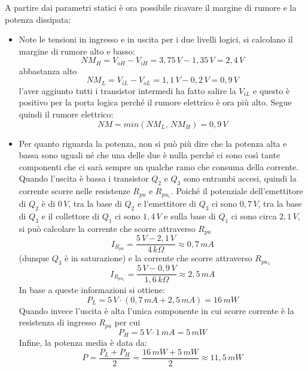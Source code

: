\documentclass[12pt, a4paper]{report}
\begin{document}
A partire dai parametri statici è ora possibile ricavare il margine di rumore e la potenza dissipata:
\begin{itemize}
    \item Note le tensioni in ingresso e in uscita per i due livelli logici, si calcolano il margine di rumore alto e basso:
    \begin{equation*}
        \textit{NM}_{H} = V_{oH} - V_{iH} = 3,75\,V - 1,35\,V = 2,4\,V
    \end{equation*}
    abbastanza alto
    \begin{equation*}
        \textit{NM}_{L} = V_{iL} - V_{oL} = 1,1\,V - 0,2\,V = 0,9\,V
    \end{equation*}
    l'aver aggiunto tutti i transistor intermedi ha fatto salire la $V_{iL}$ e questo è positivo per la porta logica perché il rumore elettrico è ora più alto. Segue quindi il rumore elettrico:
    \begin{equation}
        \textit{NM} = min(\textit{NM}_{L},\, \textit{NM}_{H}) = 0,9\,V
    \end{equation}
    \item Per quanto riguarda la potenza, non si può più dire che la potenza alta e bassa sono uguali né che una delle due è nulla perché ci sono così tante componenti che ci sarà sempre un qualche ramo che consuma della corrente. Quando l'uscita è bassa i transistor $Q_2$ e $Q_3$ sono entrambi accesi, quindi la corrente scorre nelle resistenze $R_{pu}$ e $R_{pu_{1}}$. Poiché il potenziale dell'emettitore di $Q_2$ è di $0\,V$, tra la base di $Q_2$ e l'emettitore di $Q_3$ ci sono $0,7\,V$, tra la base di $Q_3$ e il collettore di $Q_1$ ci sono $1,4\,V$ e sulla base di $Q_1$ ci sono circa $2,1\,V$, si può calcolare la corrente che scorre attraverso $R_{pu}$
    \begin{equation*}
        I_{R_{pu}} = \frac{5\,V - 2,1\,V}{4\,k\Omega} \approx 0,7\,mA
    \end{equation*}
    (dunque $Q_3$ è in saturazione) e la corrente che scorre attraverso $R_{pu_{1}}$
    \begin{equation*}
        I_{R_{pu_{1}}} = \frac{5\,V - 0,9\,V}{1,6\,k\Omega} \approx 2,5\,mA
    \end{equation*}
    In base a queste informazioni si ottiene:
    \begin{equation*}
        P_{L} = 5\,V \cdot (0,7\,mA + 2,5\,mA) = 16\,mW
    \end{equation*}
    Quando invece l'uscita è alta l'unica componente in cui scorre corrente è la resistenza di ingresso $R_{pu}$ per cui
    \begin{equation*}
        P_{H} = 5\,V \cdot 1\,mA = 5\,mW
    \end{equation*}
    Infine, la potenza media è data da:
    \begin{equation}
        P = \frac{P_{L} + P_{H}}{2} = \frac{16\,mW + 5\,mW}{2} \approx 11,5\,mW
    \end{equation}
\end{itemize}
\end{document}
